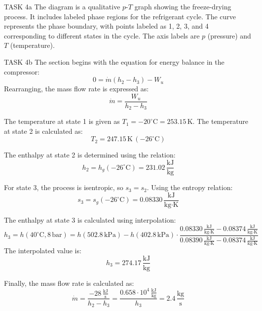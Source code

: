 TASK 4a  
The diagram is a qualitative \( p \)-\( T \) graph showing the freeze-drying process. It includes labeled phase regions for the refrigerant cycle. The curve represents the phase boundary, with points labeled as 1, 2, 3, and 4 corresponding to different states in the cycle. The axis labels are \( p \) (pressure) and \( T \) (temperature).  

TASK 4b  
The section begins with the equation for energy balance in the compressor:  
\[
0 = \dot{m} (h_2 - h_3) - W_u
\]  
Rearranging, the mass flow rate is expressed as:  
\[
\dot{m} = \frac{W_u}{h_2 - h_3}
\]  

The temperature at state 1 is given as \( T_1 = -20^\circ\text{C} = 253.15 \, \text{K} \).  
The temperature at state 2 is calculated as:  
\[
T_2 = 247.15 \, \text{K} \, (-26^\circ\text{C})
\]  

The enthalpy at state 2 is determined using the relation:  
\[
h_2 = h_g(-26^\circ\text{C}) = 231.02 \, \frac{\text{kJ}}{\text{kg}}
\]  

For state 3, the process is isentropic, so \( s_3 = s_2 \). Using the entropy relation:  
\[
s_3 = s_g(-26^\circ\text{C}) = 0.08330 \, \frac{\text{kJ}}{\text{kg·K}}
\]  

The enthalpy at state 3 is calculated using interpolation:  
\[
h_3 = h(40^\circ\text{C}, 8 \, \text{bar}) = h(502.8 \, \text{kPa}) - h(402.8 \, \text{kPa}) \cdot \frac{0.08330 \, \frac{\text{kJ}}{\text{kg·K}} - 0.08374 \, \frac{\text{kJ}}{\text{kg·K}}}{0.08390 \, \frac{\text{kJ}}{\text{kg·K}} - 0.08374 \, \frac{\text{kJ}}{\text{kg·K}}}
\]  
The interpolated value is:  
\[
h_3 = 274.17 \, \frac{\text{kJ}}{\text{kg}}
\]  

Finally, the mass flow rate is calculated as:  
\[
\dot{m} = \frac{-28 \, \frac{\text{kJ}}{\text{s}}}{h_2 - h_3} = \frac{0.658 \cdot 10^4 \, \frac{\text{kJ}}{\text{kg}}}{h_3} = 2.4 \, \frac{\text{kg}}{\text{s}}
\]